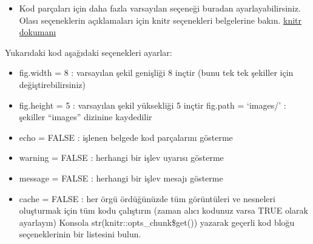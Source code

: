 \documentclass[
  oneside]{book}
\newenvironment{Shaded}{\begin{snugshade}}{\end{snugshade}}
\newcommand{\AttributeTok}[1]{\textcolor[rgb]{0.13,0.29,0.53}{#1}}
\newcommand{\ConstantTok}[1]{\textcolor[rgb]{0.56,0.35,0.01}{#1}}
\newcommand{\DecValTok}[1]{\textcolor[rgb]{0.00,0.00,0.81}{#1}}
\newcommand{\FunctionTok}[1]{\textcolor[rgb]{0.13,0.29,0.53}{\textbf{#1}}}
\newcommand{\NormalTok}[1]{#1}
\newcommand{\SpecialCharTok}[1]{\textcolor[rgb]{0.81,0.36,0.00}{\textbf{#1}}}
\newcommand{\StringTok}[1]{\textcolor[rgb]{0.31,0.60,0.02}{#1}}
\providecommand{\tightlist}{%
  \setlength{\itemsep}{0pt}\setlength{\parskip}{0pt}}
\begin{document}
\begin{Shaded}
\end{Shaded}

\begin{itemize}
\tightlist
\item
  Kod parçaları için daha fazla varsayılan seçeneği buradan ayarlayabilirsiniz. Olası seçeneklerin açıklamaları için knitr seçenekleri belgelerine bakın. \href{https://yihui.name/knitr/options/}{knitr dokumanı}
\end{itemize}

\begin{Shaded}
\end{Shaded}

Yukarıdaki kod aşağıdaki seçenekleri ayarlar:

\begin{itemize}
\item
  fig.width = 8 : varsayılan şekil genişliği 8 inçtir (bunu tek tek şekiller için değiştirebilirsiniz)
\item
  fig.height = 5 : varsayılan şekil yüksekliği 5 inçtir fig.path = `images/' : şekiller ``images'' dizinine kaydedilir
\item
  echo = FALSE : işlenen belgede kod parçalarını gösterme
\item
  warning = FALSE : herhangi bir işlev uyarısı gösterme
\item
  message = FALSE : herhangi bir işlev mesajı gösterme
\item
  cache = FALSE : her örgü ördüğünüzde tüm görüntüleri ve nesneleri oluşturmak için tüm kodu çalıştırın (zaman alıcı kodunuz varsa TRUE olarak ayarlayın) Konsola {{str}{(}{knitr}{::}{opts\_chunk}{\$}{get}{(}{)}{)}} yazarak geçerli kod bloğu seçeneklerinin bir listesini bulun.
\end{itemize}
\end{document}
